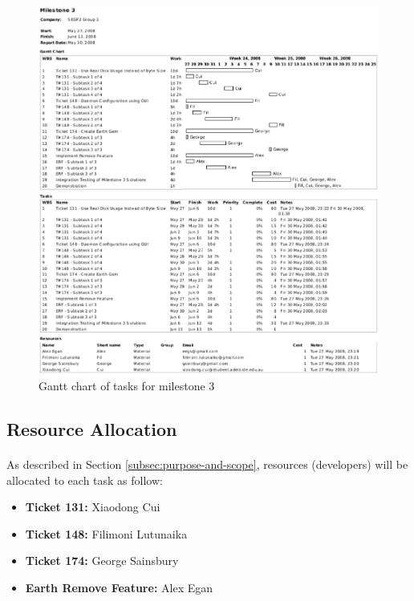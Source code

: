 \documentclass[10pt,a4,oneside]{article}
\begin{document}
\begin{figure}[h!]
\begin{centering}
\includegraphics[width=150mm]{figs/m3gantt}
\end{centering}
\caption{Gantt chart of tasks for milestone 3}
\label{fig:m3gantt}
\end{figure}

\newpage

\subsection{Resource Allocation}
 
\paragraph{}
As described in Section \ref{subsec:purpose-and-scope}, resources (developers) will be allocated to 
each task as follow:
 
\begin{itemize}
  
\item \textbf{Ticket 131:} Xiaodong Cui \\
 
\item \textbf{Ticket 148:} Filimoni Lutunaika \\
 
\item \textbf{Ticket 174:} George Sainsbury \\
 
\item \textbf{Earth Remove Feature:} Alex Egan \\
 
\end{itemize}
 
\end{document}
